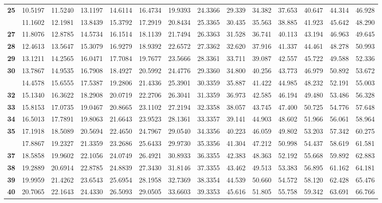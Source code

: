 \documentclass[]{article}
\begin{document}
\begin{longtable}{>{\bfseries}r|rrrrrrrrrrrrr}
25 & 10.5197 & 11.5240 & 13.1197 & 14.6114 & 16.4734 & 19.9393 & 24.3366 & 29.339 & 34.382 & 37.653 & 40.647 & 44.314 & 46.928\\
\addlinespace
26 & 11.1602 & 12.1981 & 13.8439 & 15.3792 & 17.2919 & 20.8434 & 25.3365 & 30.435 & 35.563 & 38.885 & 41.923 & 45.642 & 48.290\\
27 & 11.8076 & 12.8785 & 14.5734 & 16.1514 & 18.1139 & 21.7494 & 26.3363 & 31.528 & 36.741 & 40.113 & 43.194 & 46.963 & 49.645\\
28 & 12.4613 & 13.5647 & 15.3079 & 16.9279 & 18.9392 & 22.6572 & 27.3362 & 32.620 & 37.916 & 41.337 & 44.461 & 48.278 & 50.993\\
29 & 13.1211 & 14.2565 & 16.0471 & 17.7084 & 19.7677 & 23.5666 & 28.3361 & 33.711 & 39.087 & 42.557 & 45.722 & 49.588 & 52.336\\
30 & 13.7867 & 14.9535 & 16.7908 & 18.4927 & 20.5992 & 24.4776 & 29.3360 & 34.800 & 40.256 & 43.773 & 46.979 & 50.892 & 53.672\\
\addlinespace
31 & 14.4578 & 15.6555 & 17.5387 & 19.2806 & 21.4336 & 25.3901 & 30.3359 & 35.887 & 41.422 & 44.985 & 48.232 & 52.191 & 55.003\\
32 & 15.1340 & 16.3622 & 18.2908 & 20.0719 & 22.2706 & 26.3041 & 31.3359 & 36.973 & 42.585 & 46.194 & 49.480 & 53.486 & 56.328\\
33 & 15.8153 & 17.0735 & 19.0467 & 20.8665 & 23.1102 & 27.2194 & 32.3358 & 38.057 & 43.745 & 47.400 & 50.725 & 54.776 & 57.648\\
34 & 16.5013 & 17.7891 & 19.8063 & 21.6643 & 23.9523 & 28.1361 & 33.3357 & 39.141 & 44.903 & 48.602 & 51.966 & 56.061 & 58.964\\
35 & 17.1918 & 18.5089 & 20.5694 & 22.4650 & 24.7967 & 29.0540 & 34.3356 & 40.223 & 46.059 & 49.802 & 53.203 & 57.342 & 60.275\\
\addlinespace
36 & 17.8867 & 19.2327 & 21.3359 & 23.2686 & 25.6433 & 29.9730 & 35.3356 & 41.304 & 47.212 & 50.998 & 54.437 & 58.619 & 61.581\\
37 & 18.5858 & 19.9602 & 22.1056 & 24.0749 & 26.4921 & 30.8933 & 36.3355 & 42.383 & 48.363 & 52.192 & 55.668 & 59.892 & 62.883\\
38 & 19.2889 & 20.6914 & 22.8785 & 24.8839 & 27.3430 & 31.8146 & 37.3355 & 43.462 & 49.513 & 53.383 & 56.895 & 61.162 & 64.181\\
39 & 19.9959 & 21.4262 & 23.6543 & 25.6954 & 28.1958 & 32.7369 & 38.3354 & 44.539 & 50.660 & 54.572 & 58.120 & 62.428 & 65.476\\
40 & 20.7065 & 22.1643 & 24.4330 & 26.5093 & 29.0505 & 33.6603 & 39.3353 & 45.616 & 51.805 & 55.758 & 59.342 & 63.691 & 66.766\\

\end{longtable}
\end{document}
